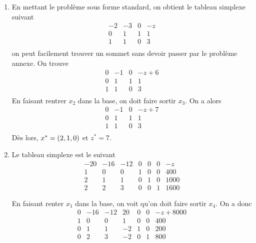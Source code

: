 \begin{enumerate}
    \begin{solution}
      \begin{enumerate}
        \item En mettant le problème sous forme standard,
          on obtient le tableau simplexe suivant
          \[
            \begin{array}{ccc|l}
              -2 & -3 & 0 & -z\\
              \hline
              0 &  1 & 1 & 1\\
              1 &  1 & 0 & 3\\
            \end{array}
          \]
          on peut facilement trouver un sommet sans devoir passer
          par le problème annexe.
          On trouve
          \[
            \begin{array}{ccc|l}
              0 & -1 & 0 & -z+6\\
              \hline
              0 &  1 & 1 & 1\\
              1 &  1 & 0 & 3\\
            \end{array}
          \]
          En faisant rentrer $x_2$ dans la base,
          on doit faire sortir $x_3$.
          On a alors
          \[
            \begin{array}
              {ccc|l}
              0 & -1 & 0 & -z+7\\
              \hline
              0 &  1 & 1 & 1\\
              1 &  1 & 0 & 3\\
            \end{array}
          \]
          Dès lors, $x^* = (2,1,0)$ et $z^* = 7$.
        \item
          \label{itm:sim400}
          Le tableau simplexe est le suivant
          \[
            \begin{array}{cccccc|l}
              -20 & -16 & -12 & 0 & 0 & 0 & -z\\
              \hline
              1 &   0 &   0 & 1 & 0 & 0 & 400\\
              2 &   1 &   1 & 0 & 1 & 0 & 1000\\
              2 &   2 &   3 & 0 & 0 & 1 & 1600
            \end{array}
          \]

          En faisant renter $x_1$ dans la base,
          on voit qu'on doit faire sortir $x_4$.
          On a donc
          \[
            \begin{array}{cccccc|l}
              0 & -16 & -12 & 20 & 0 & 0 & -z+8000\\
              \hline
              1 &   0 &   0 &  1 & 0 & 0 & 400\\
              0 &   1 &   1 & -2 & 1 & 0 & 200\\
              0 &   2 &   3 & -2 & 0 & 1 & 800
            \end{array}
          \]


\end{enumerate}
\end{solution}
\end{enumerate}
